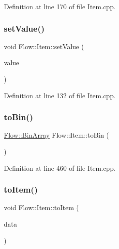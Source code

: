 Definition at line 170 of file Item.\+cpp.

\hypertarget{class_flow_1_1_item_a7d75440f38fee7525f378c5115fdebfe}{}\label{class_flow_1_1_item_a7d75440f38fee7525f378c5115fdebfe} 
\subsubsection{\texorpdfstring{set\+Value()}{setValue()}}
{\footnotesize\ttfamily void Flow\+::\+Item\+::set\+Value (\begin{DoxyParamCaption}\item[{unsigned char}]{value }\end{DoxyParamCaption})}



Definition at line 132 of file Item.\+cpp.

\hypertarget{class_flow_1_1_item_a47f0733443d0a22925f8c9fccfd94ca7}{}\label{class_flow_1_1_item_a47f0733443d0a22925f8c9fccfd94ca7} 
\subsubsection{\texorpdfstring{to\+Bin()}{toBin()}}
{\footnotesize\ttfamily \hyperlink{class_flow_1_1_bin_array}{Flow\+::\+Bin\+Array} Flow\+::\+Item\+::to\+Bin (\begin{DoxyParamCaption}{ }\end{DoxyParamCaption})}



Definition at line 460 of file Item.\+cpp.

\hypertarget{class_flow_1_1_item_a0dab51061ec049d574225ebbf1a1ee31}{}\label{class_flow_1_1_item_a0dab51061ec049d574225ebbf1a1ee31} 
\subsubsection{\texorpdfstring{to\+Item()}{toItem()}}
{\footnotesize\ttfamily void Flow\+::\+Item\+::to\+Item (\begin{DoxyParamCaption}\item[{\hyperlink{class_flow_1_1_bin_array}{Bin\+Array} \&}]{data }\end{DoxyParamCaption})}



